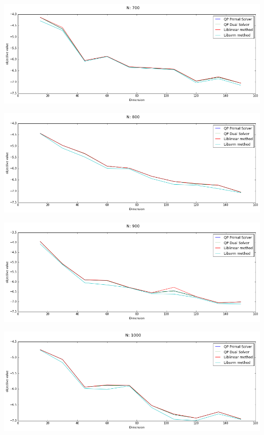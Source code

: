 \documentclass[12pt, a4paper]{article}
\begin{document}
			\begin{center}
				\includegraphics[width=17cm]{1par_obj_N700_one.png}
			\end{center}

			\begin{center}
				\includegraphics[width=17cm]{1par_obj_N800_one.png}
			\end{center}

			\begin{center}
				\includegraphics[width=17cm]{1par_obj_N900_one.png}
			\end{center}

			\begin{center}
				\includegraphics[width=17cm]{1par_obj_N1000_one.png}
			\end{center}
\end{document}
